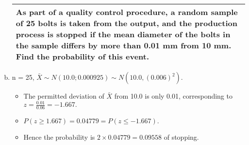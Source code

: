 \documentclass[a4paper,12pt]{article}
\begin{document}
\begin{enumerate}[(a)]
\newpage
  \begin{table}[ht!]
     \centering
     \begin{tabular}{|p{15cm}|}
     \hline  
 As part of a quality control procedure, a random sample of 25 bolts is taken from the output, and the production process is stopped if the mean diameter of the bolts in the sample differs by more than 0.01 mm from 10 mm.  Find the probability of this event.
\\ \hline
      \end{tabular}
    \end{table}

\item n = 25, $\bar{X} \sim N(10.0; 0.0009
25 ) \sim N(10.0, (0.006)^2)$.
\begin{itemize}
\item The permitted deviation of $\bar{X}$ from 10.0 is only 0.01, corresponding to $z = \frac{0.01}{0.06} = -1.667.$

\item $P(z \geq 1.667) = 0.04779 = P(z \leq -1.667)$.
\item Hence the probability is $2 \times 0.04779 = 0.09558$ of stopping.
\end{itemize}
\end{enumerate}
\end{document}
